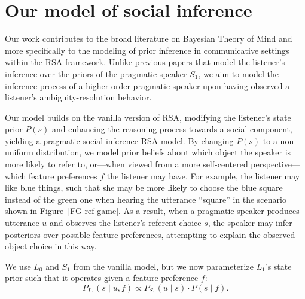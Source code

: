 \documentclass[11pt,a4paper]{article}
\newcommand{\gcs}[1]{\textcolor{blue}{[gcs: #1]}}
\begin{document}

\section{Our model of social inference} \label{socialRSA}

Our work contributes to the broad literature on Bayesian Theory of Mind and more specifically to the modeling of prior inference in communicative settings within the RSA framework. Unlike previous papers that model the listener's inference over the priors of the pragmatic speaker $S_1$, we aim to model the inference process of a higher-order pragmatic speaker upon having observed a listener's ambiguity-resolution behavior. %

Our model builds on the vanilla version of RSA, modifying the listener's state prior $P(s)$ and enhancing the reasoning process towards a social component, yielding a {pragmatic social-inference RSA} model. %
By changing $P(s)$ to a non-uniform distribution, we model prior beliefs about which object the speaker is more likely to refer to, or---when viewed from a more self-centered perspective---which feature preferences $f$ the listener may have. 
For example, the listener may like blue things, such that she may be more likely to choose the blue square instead of the green one when hearing the utterance ``square'' in the scenario shown in Figure~\ref{FG-ref-game}.
As a result, when a pragmatic speaker produces utterance $u$ and observes the listener's referent choice $s$, the speaker may infer posteriors over possible feature preferences, attempting to explain the observed object choice in this way.

We use $L_0$ and $S_1$ from the vanilla model, but we now parameterize $L_1$'s state prior such that it operates given a feature preference $f$:
\begin{equation}
P_{L_{1}}(s\mid u,f) \propto P_{S_{1}}(u \mid s) \cdot P(s \mid f).
\end{equation}
\end{document}

